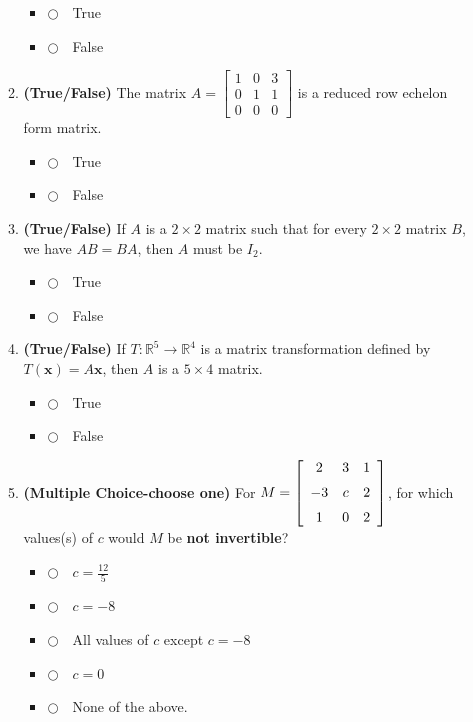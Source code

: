 \documentclass[12pt]{extarticle}
\newcommand{\chooseone}{{\Large$\Circle$\ \ }}
\begin{document}
\begin{enumerate}
\begin{enumerate}[label=\alph*.]
\begin{itemize}[label={}] 
\item \chooseone True
\item \chooseone False
\end{itemize}
\vspace{2cm}

\item \textbf{(True/False)} The matrix $A=\left[\begin{array}{ccc}
1 & 0 & 3
\\
 0 & 1 & 1
\\
 0 & 0 & 0 
\end{array}\right]
$ is a reduced row echelon form matrix.
\begin{itemize}[label={}] 
\item \chooseone True
\item \chooseone False
\end{itemize}
\vspace{2cm}

\item \textbf{(True/False)} If $A$ is a $2\times 2$ matrix such that for every $2\times 2$ matrix $B$, we have $AB=BA$, then $A$ must be $I_2$.
\begin{itemize}[label={}] 
\item \chooseone True
\item \chooseone False
\end{itemize}
\vspace{2cm}

\item  \textbf{(True/False)} If $T:\mathbb{R}^5\to\mathbb{R}^4$ is a matrix transformation defined by $T(\mathbf{x})=A\mathbf{x}$, then $A$ is a $5\times 4$ matrix.

\begin{itemize}[label={}]
\item \chooseone True
\item \chooseone False
\end{itemize}


\newpage

\item \textbf{(Multiple Choice-choose one)} For $M= \left[ \begin {array}{ccc} 2&3&1\\ \noalign{\medskip}-3&c&2
\\ \noalign{\medskip}1&0&2\end {array} \right]$, for which values(s) of $c$ would $M$ be \textbf{not invertible}?
\begin{itemize}[label={}]
\item \chooseone $c=\frac{12}{5}$
\item \chooseone $c=-8$
\item \chooseone All values of $c$ except $c=-8$
\item \chooseone  $c=0$
\item \chooseone None of the above.
\end{itemize}


\end{enumerate}
\end{enumerate}
\end{document}
